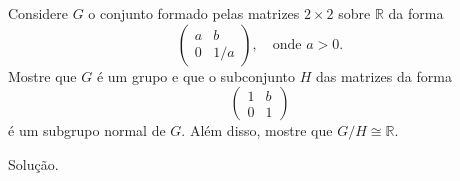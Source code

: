 \begin{homeworkProblem}
  Considere $G$ o conjunto formado pelas matrizes $2 \times 2$ sobre $\mathbb{R}$ da forma
\[
\begin{pmatrix}
a & b \\
0 & 1/a
\end{pmatrix}, \quad \text{onde } a > 0.
\]
Mostre que $G$ é um grupo e que o subconjunto $H$ das matrizes da forma
\[
\begin{pmatrix}
1 & b \\
0 & 1
\end{pmatrix}
\]
é um subgrupo normal de $G$. Além disso, mostre que $G/H \cong \mathbb{R}$.
  \begin{solution}
    Solução.
  \end{solution}
\end{homeworkProblem}
